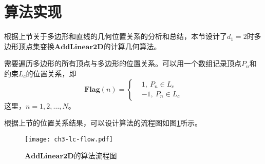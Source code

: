 \section{算法实现}\label{sect:3.3}
根据上节关于多边形和直线的几何位置关系的分析和总结，本节设计了$d_{1}=2$时多边形顶点集变换$\mathbf{AddLinear2D}$的计算几何算法。

需要遍历多边形的所有顶点与多边形的位置关系。可以用一个数组记录顶点$P_{n}$和约束$L_{c}$的位置关系，即
\begin{equation}%
\mathbf{Flag}(n)=\left\{
\begin{aligned}%
&1,\ P_{n}\in L_{c}\\
&-1,\ P_{n}\in L_{c}
\end{aligned}
\end{equation}
这里，$n=1,2,\ldots,N$。

根据上节的位置关系结果，可以设计算法的流程图如图\ref{fig.3.ic.flow}所示。
\begin{figure}[htb]
 \centering
 \texttt{[image: ch3-lc-flow.pdf]}\\	 %
 \caption{$\mathbf{AddLinear2D}$的算法流程图}
 \label{fig.3.ic.flow}
\end{figure}

